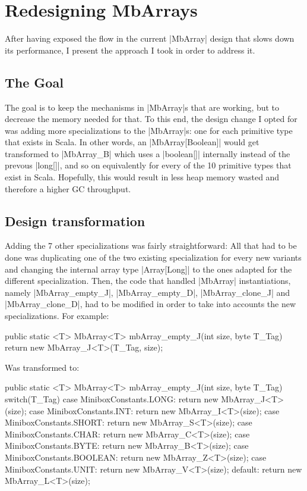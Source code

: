\section{Redesigning MbArrays}
\label{sec:redesign}

After having exposed the flow in the current |MbArray| design that slows down its performance, I present the approach I took in order to address it.

\subsection{The Goal}

The goal is to keep the mechanisms in |MbArray|s that are working, but to decrease the memory needed for that.
To this end, the design change I opted for was adding more specializations to the |MbArray|s: one for each primitive type that exists in Scala. In other words, an |MbArray[Boolean]| would get transformed to |MbArray_B| which uses a |boolean[]| internally instead of the prevous |long[]|, and so on equivalently for every of the 10 primitive types that exist in Scala. Hopefully, this would result in less heap memory wasted and therefore a higher GC throughput.

\subsection{Design transformation}

Adding the 7 other specializations was fairly straightforward: All that had to be done was duplicating one of the two existing specialization for every new variants and changing the internal array type |Array[Long]| to the ones adapted for the different specialization.
Then, the code that handled |MbArray| instantiations, namely |MbArray_empty_J|, |MbArray_empty_D|, |MbArray_clone_J| and |MbArray_clone_D|, had to be modified in order to take into accounts the new specializations.
For example:

\begin{lstlisting-nobreak-java}
public static <T> MbArray<T> mbArray_empty_J(int size, byte T_Tag) {
  return new MbArray_J<T>(T_Tag, size);
}
\end{lstlisting-nobreak-java}

Was transformed to:

\begin{lstlisting-nobreak-java}
public static <T> MbArray<T> mbArray_empty_J(int size, byte T_Tag) {
  switch(T_Tag) {
  case MiniboxConstants.LONG:
    return new MbArray_J<T>(size);
  case MiniboxConstants.INT:
    return new MbArray_I<T>(size);
  case MiniboxConstants.SHORT:
    return new MbArray_S<T>(size);
  case MiniboxConstants.CHAR:
    return new MbArray_C<T>(size);
  case MiniboxConstants.BYTE:
    return new MbArray_B<T>(size);
  case MiniboxConstants.BOOLEAN:
    return new MbArray_Z<T>(size);
  case MiniboxConstants.UNIT:
    return new MbArray_V<T>(size);
  default:
    return new MbArray_L<T>(size);
  }
}
\end{lstlisting-nobreak-java}

